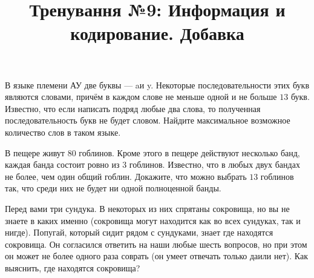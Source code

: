 



\title{Тренування №9: Информация и кодирование. Добавка}
\maketitle

\begin{problem}
	В языке племени АУ две буквы --- \guillemotleft a\guillemotright и \guillemotleft y\guillemotright. Некоторые последовательности этих букв являются словами, причём в каждом слове не меньше одной и не больше $13$ букв. Известно, что если написать подряд любые два слова, то полученная последовательность букв не будет словом. Найдите максимальное возможное количество слов в таком языке.
\end{problem}

\begin{problem}
	В пещере живут $80$ гоблинов. Кроме этого в пещере действуют несколько банд, каждая банда состоит ровно из $3$ гоблинов. Известно, что в любых двух бандах не более, чем один общий гоблин. Докажите, что можно выбрать $13$ гоблинов так, что среди них не будет ни одной полноценной банды.
\end{problem}

\begin{problem}
	Перед вами три сундука. В некоторых из них спрятаны сокровища, но вы не знаете в каких именно (сокровища могут находится как во всех сундуках, так и нигде). Попугай, который сидит рядом с сундуками, знает где находятся сокровища. Он согласился ответить на наши любые шесть вопросов, но при этом он может не более одного раза соврать (он умеет отвечать только \guillemotleft да\guillemotright или \guillemotleft нет\guillemotright). Как выяснить, где находятся сокровища?
\end{problem}

